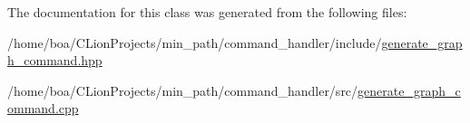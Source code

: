 The documentation for this class was generated from the following files\+:\begin{DoxyCompactItemize}
\item 
/home/boa/\+C\+Lion\+Projects/min\+\_\+path/command\+\_\+handler/include/\hyperlink{a00019}{generate\+\_\+graph\+\_\+command.\+hpp}\item 
/home/boa/\+C\+Lion\+Projects/min\+\_\+path/command\+\_\+handler/src/\hyperlink{a00025}{generate\+\_\+graph\+\_\+command.\+cpp}\end{DoxyCompactItemize}
